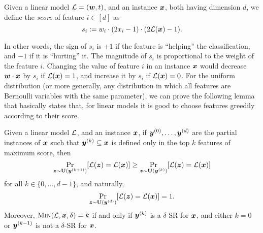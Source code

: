 \begin{definition}\label{def:scores}
    Given a linear model $\mathcal{L} = ({\bm{w}}, t)$, and an instance ${\bm{x}}$, both having dimension $d$, we define the \emph{score} of feature $i \in [d]$ as 
    \[
        s_i := w_i \cdot (2x_i - 1) \cdot (2\mathcal{L}({\bm{x}}) - 1).    
    \]
\end{definition}

In other words, the sign of $s_i$ is $+1$ if the feature is ``helping'' the classification, and $-1$ if it is ``hurting'' it. The magnitude of $s_i$ is proportional to the weight of the feature $i$. Changing the value of feature $i$ in an instance ${\bm{x}}$ would decrease ${\bm{w}} \cdot {\bm{x}}$ by $s_i$ if $\mathcal{L}({\bm{x}}) = 1$, and increase it by $s_i$ if $\mathcal{L}({\bm{x}}) = 0$.
For the uniform distribution (or more generally, any distribution in which all features are Bernoulli variables with the same parameter), we can prove the following lemma that basically states that, for linear models it is good to choose features greedily according to their score.

\begin{lemma}\label{lemma:greedy}
    Given a linear model $\mathcal{L}$, and an instance ${\bm{x}}$, if ${\bm{y}}^{(0)}, \ldots, {\bm{y}}^{(d)}$ are the partial instances of ${\bm{x}}$ such that ${\bm{y}}^{(k)} \subseteq {\bm{x}}$ is defined only in the top $k$ features of maximum score, then
    \[ 
        \Pr_{{\bm{z}} \sim \mathbf{U}({\bm{y}}^{(k+1)})}[\mathcal{L}({\bm{z}}) = \mathcal{L}({\bm{x}})] \geq \Pr_{{\bm{z}} \sim \mathbf{U}({\bm{y}}^{(k)})}[\mathcal{L}({\bm{z}}) = \mathcal{L}({\bm{x}})]
    \]
    for all $k \in \{0, \ldots, d-1\}$, and naturally, 
    \[ 
    \Pr_{{\bm{z}} \sim \mathbf{U}({\bm{y}}^{(d)})}[\mathcal{L}({\bm{z}}) = \mathcal{L}({\bm{x}})] = 1.
    \]
    Moreover, $\operatorname{\textnormal{\textsc{Min}}}(\mathcal{L}, {\bm{x}}, \delta) = k$ if and only if ${\bm{y}}^{(k)}$ is a $\delta$-SR for ${\bm{x}}$, and either $k = 0$ or ${\bm{y}}^{(k-1)}$ is not a $\delta$-SR for ${\bm{x}}$. 
    \end{lemma}

